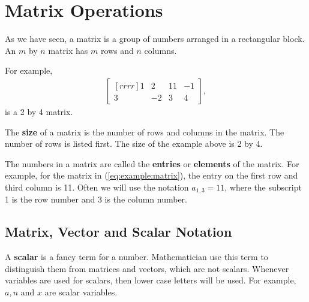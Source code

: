 %
%
%
%
%
%
%
%
%
%
%
%
%



\vfill \pagebreak

\section{Matrix Operations}
\label{sect:matrix:operations}

As we have seen, a matrix is a group of numbers arranged in a rectangular block.  An $m$ by $n$ matrix has $m$ rows and $n$ columns. 

For example,
%
\begin{align}
\begin{bmatrix}[rrrr]
1 & 2 & 11 & -1 \\ 3 & -2 & 3 & 4
\end{bmatrix}, \label{eq:example:matrix}
\end{align}
is a 2 by 4 matrix.

The \textbf{size} of a matrix is the number of rows and columns in the matrix.  The number of rows is listed first.  The size of the example above is 2 by 4.  

The numbers in a matrix are called the \textbf{entries} or \textbf{elements} of the matrix.  For example, for the matrix in (\ref{eq:example:matrix}), the entry on the first row and third column is 11.  Often we will use the notation $a_{1,3} = 11$, where the subscript 1 is the row number and $3$ is the column number. 

\subsection{Matrix, Vector and Scalar Notation}

A \textbf{scalar} is a fancy term for a number.  Mathematician use this term to distinguish them from matrices and vectors, which are not scalars.  Whenever variables are used for scalars, then lower case letters will be used.  For example, $a, n$ and $x$ are scalar variables.  

